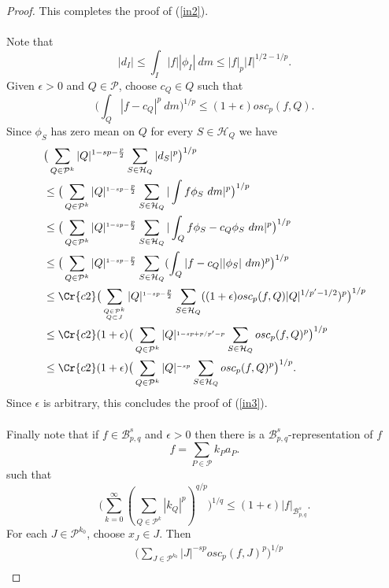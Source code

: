 \documentclass{amsart}
\theoremstyle{definition}
\newcommand{\Crr}[1]{\Cr{#1}}
\begin{document}
\begin{proof}
This completes the proof of (\ref{in2}). \\ \\
 Note that
$$|d_I|\leq  \int_I |f| |\phi_I|\ dm\leq |f|_p |I|^{1/2-1/p}.$$Given $\epsilon > 0$ and  $Q \in \mathcal{P}$, choose $c_Q\in Q$ such that 
$$\Big( \int_Q |f - c_Q|^p \ dm \Big)^{1/p} \leq (1+\epsilon)  osc_p(f,Q).$$
 Since $\phi_S$ has zero mean on $Q$ for every $S\in \mathcal{H}_Q$ we have 
\begin{align*} 
&\big(\sum_{Q\in \mathcal{P}^{k}}|Q|^{1-sp -\frac{p}{2}}  \sum_{S\in \mathcal{H}_Q}  |d_S|^p\big)^{1/p} \\
&\leq\big(\sum_{Q\in \mathcal{P}^{k}}  |Q|^{_{1-sp -\frac{p}{2}}}  \sum_{S\in \mathcal{H}_Q}  |\int f \phi_S \ dm |^p \big)^{1/p} \\
&\leq\big(\sum_{Q\in \mathcal{P}^{k}} |Q|^{_{1-sp -\frac{p}{2}}}  \sum_{S\in \mathcal{H}_Q}  |\int_Q f \phi_S -c_Q \phi_S\ dm |^p \big)^{1/p} \\
&\leq\big(\sum_{Q\in \mathcal{P}^{k}}  |Q|^{_{1-sp -\frac{p}{2}}}  \sum_{S\in \mathcal{H}_Q} (\int_Q |f - c_Q| |\phi_S| \ dm )^p \big)^{1/p} \\
&\leq \Crr{c2}\big(\sum_{\substack{_{Q\in \mathcal{P}^{k}}\\ _{Q\subset J}}}  |Q|^{_{1-sp -\frac{p}{2}}}   \sum_{S\in \mathcal{H}_Q} ((1+\epsilon) osc_p(f,Q) |Q|^{1/p'-1/2} )^p \big)^{1/p} \\
&\leq \Crr{c2}(1+\epsilon) \big(\sum_{Q\in \mathcal{P}^{k}} |Q|^{_{1-sp +p/p'-p}}   \sum_{S\in \mathcal{H}_Q} osc_p(f,Q)^p  \big)^{1/p} \\
&\leq \Crr{c2} (1+\epsilon)\big(\sum_{Q\in \mathcal{P}^{k}} |Q|^{_{-sp}}  \sum_{S\in \mathcal{H}_Q}  osc_p(f,Q)^p  \big)^{1/p}.
\end{align*}
Since $\epsilon$ is arbitrary, this concludes the proof of (\ref{in3}). \\ \\
 Finally note that  if $f \in \mathcal{B}^s_{p,q}$ and $\epsilon > 0$ then there is a $\mathcal{B}^s_{p,q}$-representation of $f$ 
$$f= \sum_{P \in \mathcal{P}} k_P a_P.$$
 such that 
 $$ \big( \sum_{k=0}^{\infty} (\sum_{Q \in \mathcal{P}^k}    |k_Q|^p)^{q/p} \big)^{1/q} \leq (1+\epsilon)  |f|_{\mathcal{B}^s_{p,q}}.$$
For each $J \in \mathcal{P}^{k_0}$, choose  $x_J \in J$. Then 
\begin{align}  & \Big( \sum_{J\in \mathcal{P}^{k_0} } |J|^{-sp }  osc_p(f,J)^p  \Big)^{1/p} \nonumber \\

\end{align}
\end{proof}
\end{document}
